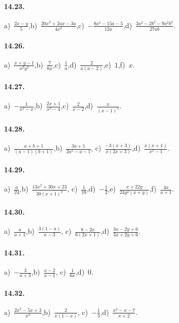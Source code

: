 \paragraph{14.23.}
a)~$\frac{2x-y}{5}$,\quad b)~$\frac{20x^{2}+2ax-3a}{4x^{2}}$,\quad c)~$-{\frac{8a^{2}-15a-5}{12a}}$,\quad d)~$\frac{3a^{2}-2b^{2}-9a^{2}b^{2}}{27ab}$.

\paragraph{14.26.}
a)~$\frac{x+y-1}{x^{2}y^{2}}$,\quad b)~$\frac{7}{6x}$,\quad c)~$\frac{1}{a}$,\quad d)~$\frac{2}{a(a-2)}$,\quad e)~$1$,\quad f)~$x$.

\paragraph{14.27.}
a)~$-{\frac{1}{x^{2}-x}}$,\quad b)~$\frac{2x+1}{x^{2}-4}$,\quad c)~$\frac{2}{x-2}$,\quad d)~$\frac{x}{(x-1)^{2}}$.

\paragraph{14.28.}
a)~$\frac{a+b+1}{(a-1)(b+1)}$,\quad b)~$\frac{3a+1}{2a^{2}-a-1}$, \quad c)~$\frac{-3(x+3)}{x(2x+3)}$,\quad d)~$\frac{x(x+1)}{x^{3}-1}$.

\paragraph{14.29.}
a)~$\frac{a}{24}$,\quad b)~$\frac{13x^{2}+30x+23}{30(x+1)^{2}}$, \quad c)~$\frac{1}{18}$,\quad d)~$-\frac{1}{2}$,\quad e)~$\frac{x+22y}{24y^{2}(x+y)}$,\quad f)~$\frac{4a}{a+1}$.

\paragraph{14.30.}
a)~$\frac{a}{a+1}$,\quad b)~$\frac{3(1-a)}{a-3}$, \quad c)~$\frac{8-2x}{6(2x+1)}$,\quad d)~$\frac{3x-2y+6}{3x+2y+6}$.

\paragraph{14.31.}
a)~$-\frac{3}{a+3}$,\quad b)~$\frac{x-2}{x-1}$, \quad c)~$\frac{1}{6x}$,\quad d)~$0$.

\paragraph{14.32.}
a)~$\frac{2x^{2}-5x+3}{x^{3}}$,\quad b)~$\frac{2}{x(1-x)}$, \quad c)~$-{\frac{1}{3}}$,\quad d)~$\frac{x^{2}-x-7}{x+2}$.

